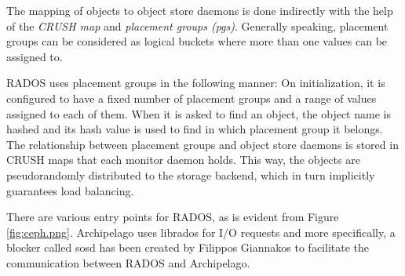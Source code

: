 The mapping of objects to object store daemons is done indirectly with the help 
of the \textit{CRUSH map} and \textit{placement groups (pgs)}.  Generally 
speaking, placement groups can be considered as logical buckets where more than 
one values can be assigned to.

RADOS uses placement groups in the following manner: On initialization, it is 
configured to have a fixed number of placement groups and a range of values 
assigned to each of them. When it is asked to find an object, the object name 
is hashed and its hash value is used to find in which placement group it 
belongs.  The relationship between placement groups and object store daemons is 
stored in CRUSH maps that each monitor daemon holds. This way, the objects are 
pseudorandomly distributed to the storage backend, which in turn implicitly 
guarantees load balancing. 

There are various entry points for RADOS, as is evident from Figure 
\ref{fig:ceph.png}. Archipelago uses librados for I/O requests and more 
specifically, a blocker called sosd\cite{sosd} has been created by Filippos 
Giannakos to facilitate the communication between RADOS and Archipelago.


